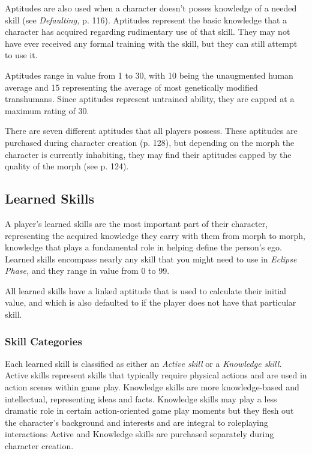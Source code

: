 Aptitudes are also used when a character doesn't 
posses knowledge of a needed skill (see \textit{Defaulting,} p. 
116). Aptitudes represent the basic knowledge that a 
character has acquired regarding rudimentary use of that 
skill. They may not have ever received any formal training
with the skill, but they can still attempt to use it.

Aptitudes range in value from 1 to 30, with 10 being 
the unaugmented human average and 15 representing 
the average of most genetically modified transhumans\textit{.}
Since aptitudes represent untrained ability, they are 
capped at a maximum rating of 30.

There are seven different aptitudes that all players 
possess. These aptitudes are purchased during character
creation (p. 128), but depending on the morph the
character is currently inhabiting, they may find their aptitudes
capped by the quality of the morph (see p. 124).

\subsection{Learned Skills}

A player's learned skills are the most important part of 
their character, representing the acquired knowledge 
they carry with them from morph to morph, knowledge
that plays a fundamental role in helping define
the person's ego. Learned skills encompass nearly any 
skill that you might need to use in \textit{Eclipse Phase,} and 
they range in value from 0 to 99.

All learned skills have a linked aptitude that is 
used to calculate their initial value, and which is 
also defaulted to if the player does not have that 
particular skill.

\subsubsection{Skill Categories}

Each learned skill is classified as either an \textit{Active skill}
or a \textit{Knowledge skill.} Active skills represent skills 
that typically require physical actions and are used in 
action scenes within game play. Knowledge skills are 
more knowledge-based and intellectual, representing 
ideas and facts. Knowledge skills may play a less dramatic
role in certain action-oriented game play moments
but they flesh out the character's background
and interests and are integral to roleplaying interactions
Active and Knowledge skills are purchased
separately during character creation.

